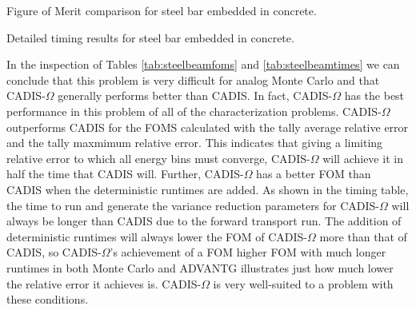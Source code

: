 \begin{table}[h!]
  \centering
  
  \caption[Figure of Merit comparison for steel bar embedded in concrete.]
  {Figure of Merit comparison for steel bar embedded in concrete. }
  \label{tab:steelbeamfoms}
\end{table}

\begin{table}[h!]
  \centering
  
  \caption[Detailed timing results for steel bar embedded in concrete.]
  {Detailed timing results for steel bar embedded in concrete.}
  \label{tab:steelbeamtimes}
\end{table}

In the inspection of Tables \ref{tab:steelbeamfoms} and
\ref{tab:steelbeamtimes} we can conclude that this problem is very difficult for
analog Monte Carlo and that CADIS-$\Omega$ generally performs better than CADIS.
In fact, CADIS-$\Omega$ has the best performance
in this problem of all of the characterization problems.
CADIS-$\Omega$ outperforms CADIS for
the FOMS calculated with the tally average relative error and the tally maxmimum
relative error. This indicates that giving a limiting relative error to which
all energy bins must converge, CADIS-$\Omega$ will achieve it in half the time
that CADIS will. Further, CADIS-$\Omega$ has a better FOM than CADIS when the
deterministic runtimes are added. As shown in the timing table, the time to run
and generate the variance reduction parameters for CADIS-$\Omega$ will always be
longer than CADIS due to the forward transport run. The addition of
deterministic runtimes will always lower the FOM of CADIS-$\Omega$ more than
that of CADIS, so CADIS-$\Omega$'s achievement of a FOM higher FOM with much
longer runtimes in both Monte Carlo and ADVANTG illustrates just how much lower
the relative error it achieves is. CADIS-$\Omega$ is very well-suited to a
problem with these conditions.

